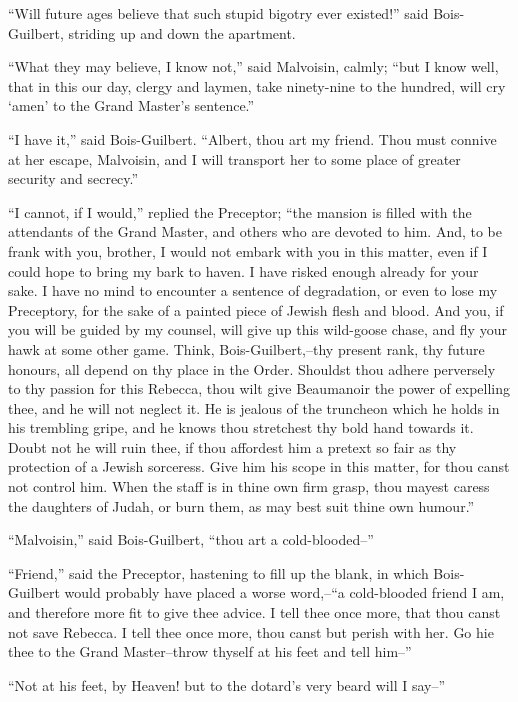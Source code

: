 ``Will future ages believe that such stupid bigotry ever existed!'' said
Bois-Guilbert, striding up and down the apartment.

``What they may believe, I know not,'' said Malvoisin, calmly; ``but I
know well, that in this our day, clergy and laymen, take ninety-nine to
the hundred, will cry `amen' to the Grand Master's sentence.''

``I have it,'' said Bois-Guilbert. ``Albert, thou art my friend. Thou
must connive at her escape, Malvoisin, and I will transport her to some
place of greater security and secrecy.''

``I cannot, if I would,'' replied the Preceptor; ``the mansion is filled
with the attendants of the Grand Master, and others who are devoted to
him. And, to be frank with you, brother, I would not embark with you in
this matter, even if I could hope to bring my bark to haven. I have
risked enough already for your sake. I have no mind to encounter a
sentence of degradation, or even to lose my Preceptory, for the sake of
a painted piece of Jewish flesh and blood. And you, if you will be
guided by my counsel, will give up this wild-goose chase, and fly your
hawk at some other game. Think, Bois-Guilbert,--thy present rank, thy
future honours, all depend on thy place in the Order. Shouldst thou
adhere perversely to thy passion for this Rebecca, thou wilt give
Beaumanoir the power of expelling thee, and he will not neglect it. He
is jealous of the truncheon which he holds in his trembling gripe, and
he knows thou stretchest thy bold hand towards it. Doubt not he will
ruin thee, if thou affordest him a pretext so fair as thy protection of
a Jewish sorceress. Give him his scope in this matter, for thou canst
not control him. When the staff is in thine own firm grasp, thou mayest
caress the daughters of Judah, or burn them, as may best suit thine own
humour.''

``Malvoisin,'' said Bois-Guilbert, ``thou art a cold-blooded--''

``Friend,'' said the Preceptor, hastening to fill up the blank, in which
Bois-Guilbert would probably have placed a worse word,--``a cold-blooded
friend I am, and therefore more fit to give thee advice. I tell thee
once more, that thou canst not save Rebecca. I tell thee once more, thou
canst but perish with her. Go hie thee to the Grand Master--throw
thyself at his feet and tell him--''

``Not at his feet, by Heaven! but to the dotard's very beard will I
say--''

